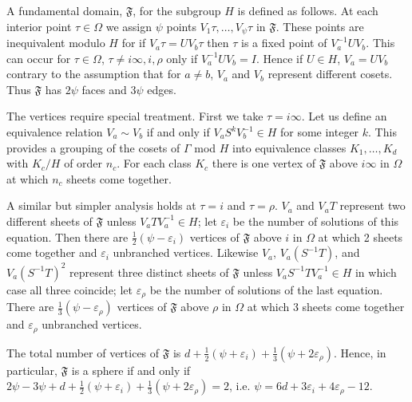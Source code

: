 A fundamental domain, $\mathfrak{F}$, for the subgroup $H$ is defined as
follows. At each interior point $\tau\in\Omega$ we assign $\psi$ points
$V_{1}\tau,\ldots,V_{\psi}\tau$ in $\mathfrak{F}$. These points are
inequivalent modulo $H$ for if $V_{a}\tau=UV_{b}\tau$ then $\tau$ is a
fixed point of $V_{a}^{-1}UV_{b}$. This can occur for
$\tau\in\Omega$, $\tau\neq i\infty,i,\rho$ only if $V_{a}^{-1}UV_{b}=I$.
Hence if $U\in H$, $V_{a}=UV_{b}$ contrary to the assumption that for
$a\neq b$, $V_{a}$ and $V_{b}$ represent different cosets. Thus
$\mathfrak{F}$ has $2\psi$ faces and $3\psi$ edges.

The vertices require special treatment. First we take $\tau=i\infty$.
Let us define an equivalence relation $V_{a}\sim V_{b}$ if and only if
$V_{a}S^{k}V_{b}^{-1}\in H$ for some integer $k$. This provides a
grouping of the cosets of $\Gamma$ mod $H$ into equivalence classes
$K_{1},\ldots,K_{d}$ with $K_{c}/H$ of order $n_{c}$. For each class
$K_{c}$ there is one vertex of $\mathfrak{F}$ above $i\infty$ in $\Omega$
at which $n_{c}$ sheets come together.

A similar but simpler analysis holds at $\tau=i$ and $\tau=\rho$.
$V_{a}$ and $V_{a}T$ represent two different sheets of $\mathfrak{F}$
unless $V_{a}TV_{a}^{-1}\in H$; let $\varepsilon_{i}$ be the number of
solutions of this equation. Then there are
$\frac{1}{2}(\psi-\varepsilon_{i})$ vertices of $\mathfrak{F}$ above $i$
in $\Omega$ at which 2 sheets come together and $\varepsilon_{i}$
unbranched vertices. Likewise $V_{a}$, $V_{a}(S^{-1}T)$, and
$V_{a}(S^{-1}T)^{2}$ represent three distinct sheets of $\mathfrak{F}$
unless $V_{a}S^{-1}TV_{a}^{-1}\in H$ in which case all three coincide;
let $\varepsilon_{\rho}$ be the number of solutions of the last equation.
There are $\frac{1}{3}(\psi-\varepsilon_{\rho})$ vertices of
$\mathfrak{F}$ above $\rho$ in $\Omega$ at which 3 sheets come together
and $\varepsilon_{\rho}$ unbranched vertices.

The total number of vertices of $\mathfrak{F}$ is
$d+\frac{1}{2}(\psi+\varepsilon_{i})+\frac{1}{3}(\psi+2\varepsilon_{\rho})$.
Hence, in particular, $\mathfrak{F}$ is a sphere if and only if
$2\psi-3\psi+d+\frac{1}{2}(\psi+\varepsilon_{i})
+\frac{1}{3}(\psi+2\varepsilon_{\rho})=2$, i.e.
$\psi=6d+3\varepsilon_{i}+4\varepsilon_{\rho}-12$.

